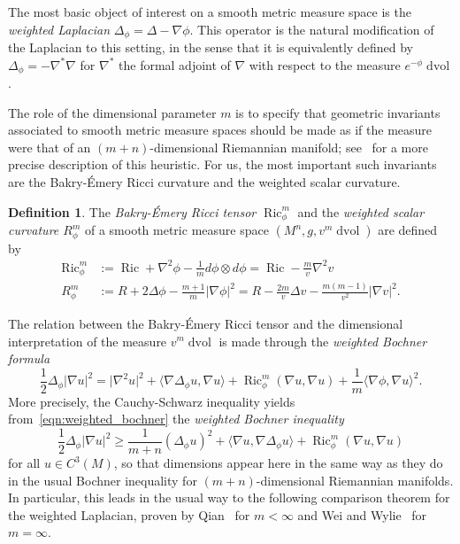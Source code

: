 \documentclass{amsart}
\theoremstyle{definition}
\newtheorem{defn}[thm]{Definition}
\theoremstyle{remark}
\numberwithin{equation}{section}
\begin{document}
The most basic object of interest on a smooth metric measure space is the \emph{weighted Laplacian} $\Delta_\phi=\Delta-\nabla\phi$.  This operator is the natural modification of the Laplacian to this setting, in the sense that it is equivalently defined by $\Delta_\phi=-\nabla^\ast\nabla$ for $\nabla^\ast$ the formal adjoint of $\nabla$ with respect to the measure $e^{-\phi}\operatorname{dvol}$.

The role of the dimensional parameter $m$ is to specify that geometric invariants associated to smooth metric measure spaces should be made as if the measure were that of an $(m+n)$-dimensional Riemannian manifold; see~\cite{Case2010a,Wei_Wylie} for a more precise description of this heuristic.  For us, the most important such invariants are the Bakry-\'Emery Ricci curvature and the weighted scalar curvature.

\begin{defn}
The \emph{Bakry-\'Emery Ricci tensor $\operatorname{Ric}_\phi^m$} and the \emph{weighted scalar curvature $R_\phi^m$} of a smooth metric measure space $(M^n,g,v^m\operatorname{dvol})$ are defined by
\begin{align*}
\operatorname{Ric}_\phi^m & := \operatorname{Ric} + \nabla^2\phi - \frac{1}{m}d\phi\otimes d\phi = \operatorname{Ric} - \frac{m}{v}\nabla^2 v \\
R_\phi^m & := R + 2\Delta\phi - \frac{m+1}{m}{\lvert}\nabla\phi{\rvert}^2 = R - \frac{2m}{v}\Delta v - \frac{m(m-1)}{v^2}{\lvert}\nabla v{\rvert}^2 .
\end{align*}
\end{defn}

The relation between the Bakry-\'Emery Ricci tensor and the dimensional interpretation of the measure $v^m\operatorname{dvol}$ is made through the \emph{weighted Bochner formula}
\begin{equation}
\label{eqn:weighted_bochner}
\frac{1}{2}\Delta_\phi{\lvert}\nabla u{\rvert}^2 = {\lvert}\nabla^2 u{\rvert}^2 + {\langle}\nabla\Delta_\phi u,\nabla u{\rangle} + \operatorname{Ric}_\phi^m(\nabla u,\nabla u) + \frac{1}{m}{\langle}\nabla\phi,\nabla u{\rangle}^2 .
\end{equation}
More precisely, the Cauchy-Schwarz inequality yields from~\eqref{eqn:weighted_bochner} the \emph{weighted Bochner inequality}
\[ \frac{1}{2}\Delta_\phi{\lvert}\nabla u{\rvert}^2 \geq \frac{1}{m+n}\left(\Delta_\phi u\right)^2 + {\langle}\nabla u,\nabla\Delta_\phi u{\rangle} + \operatorname{Ric}_\phi^m(\nabla u,\nabla u) \]
for all $u\in C^3(M)$, so that dimensions appear here in the same way as they do in the usual Bochner inequality for $(m+n)$-dimensional Riemannian manifolds.  In particular, this leads in the usual way to the following comparison theorem for the weighted Laplacian, proven by Qian~\cite{Qian1997} for $m<\infty$ and Wei and Wylie~\cite{Wei_Wylie} for $m=\infty$.
\end{document}
